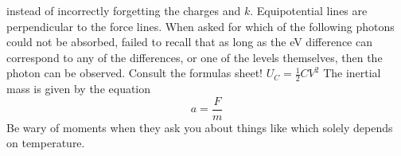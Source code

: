instead of incorrectly forgetting the charges and $k$.\markdownRendererInterblockSeparator
{}\markdownRendererUlBeginTight
\markdownRendererUlItem Equipotential lines are perpendicular to the force lines.\markdownRendererUlItemEnd 
\markdownRendererUlItem When asked for which of the following photons could not be absorbed, failed to recall that as long as the eV difference can correspond to any of the differences, or one of the levels themselves, then the photon can be observed.\markdownRendererUlItemEnd 
\markdownRendererUlItem Consult the formulas sheet! $U_C = \frac{1}{2}CV^2$\markdownRendererUlItemEnd 
\markdownRendererUlItem The inertial mass is given by the equation $$a = \frac{F}{m}$$\markdownRendererUlItemEnd 
\markdownRendererUlItem Be wary of moments when they ask you about things like  which solely depends on temperature.\markdownRendererUlItemEnd 
\markdownRendererUlEndTight \relax